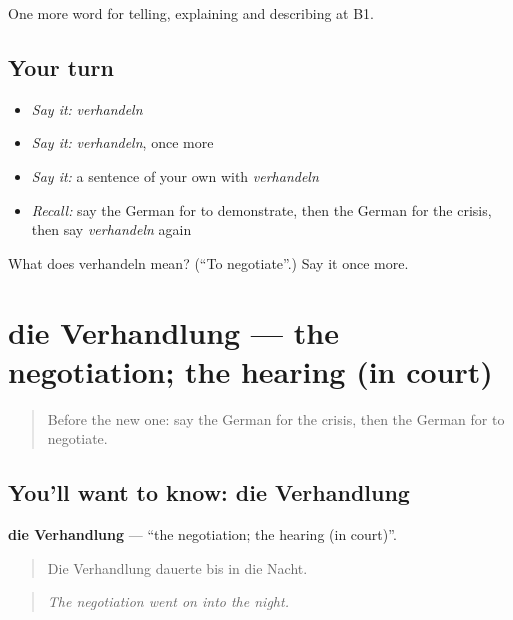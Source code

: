 \begin{grammarlens}[title={What you've built}]
One more word for telling, explaining and describing at B1.
\end{grammarlens}

\subsection*{Your turn}
\begin{itemize}
\raggedright
  \item \emph{Say it:} \emph{verhandeln}
  \item \emph{Say it:} \emph{verhandeln}, once more
  \item \emph{Say it:} a sentence of your own with \emph{verhandeln}
  \item \emph{Recall:} say the German for to demonstrate, then the German for the crisis, then say \emph{verhandeln} again
\end{itemize}

\begin{tcolorbox}[breakable,colback=teal!4,colframe=teal!35!black,title={Before you move on}]
What does verhandeln mean? (\textquotedblleft{}To negotiate\textquotedblright{}.) Say it once more.
\end{tcolorbox}
\section[die Verhandlung]{die Verhandlung — the negotiation; the hearing (in court)}

\label{lesson:GE-C278-verhandlung}



\begin{quote}
Before the new one: say the German for the crisis, then the German for to negotiate.
\end{quote}

\subsection*{You'll want to know: die Verhandlung}
\textbf{die Verhandlung} — \textquotedblleft{}the negotiation; the hearing (in court)\textquotedblright{}.

\begin{quote}
Die Verhandlung dauerte bis in die Nacht.
\end{quote}

\begin{quote}
\emph{The negotiation went on into the night.}
\end{quote}

